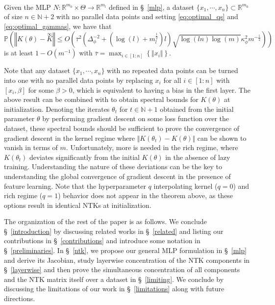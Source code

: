 \documentclass[twoside,11pt]{article}
\newcommand{\R}{\mathbb{R}}
\newcommand{\N}{\mathbb{N}}
\newcommand{\Prob}{\mathbb{P}}
\newcommand{\limiting}[1]{\overset{\scriptscriptstyle\infty}{#1}}
\begin{document}
\begin{theorem}~\\
Given the MLP $N: \R^{m_0} \times \Theta \to \R^{m_l}$ defined in \S~\ref{mlp}, a dataset $\{x_1,\cdots,x_n\} \subset \R^{m_0}$ of size $n \in \N+2$ with no parallel data points and setting \eqref{eq:optimal_qs} and \eqref{eq:optimal_gammas}, we have that
\[
\Prob\left( \left\Vert K(\theta) - \limiting{K} \right\Vert \leq O\left( \overline{\tau}^2 \left( \Delta_\phi^{-2} + \left( \log(l) + m_l^{\frac{1}{2}} \right) l \right) \sqrt{\log(ln) \log(m)} \kappa_\phi^2 m^{-\frac{1}{2}} \right) \right)
\]
is at least $1-O(m^{-1})$ with $\overline{\tau} = \max_{i \in [1:n]}\left\{ \Vert x_i \Vert \right\}$.
\end{theorem}

Note that any dataset $\{x_1,\cdots,x_n\}$ with no repeated data points can be turned into one with no parallel data points by replacing $x_i$ for all $i \in [1:n]$ with $[x_i,\beta]$ for some $\beta>0$, which is equivalent to having a bias in the first layer. The above result can be combined with \citet[Theorem~18]{mlpsateoc1} to obtain spectral bounds for $K(\theta)$ at initialization. Denoting the iterates $\theta_t$ for $t \in \N+1$ obtained from the initial parameter $\theta$ by performing gradient descent on some loss function over the dataset, these spectral bounds should be sufficient to prove the convergence of gradient descent in the kernel regime where $\Vert K(\theta_t) - K(\theta) \Vert$ can be shown to vanish in terms of $m$. Unfortunately, more is needed in the rich regime, where $K(\theta_t)$ deviates significantly from the initial $K(\theta)$ in the absence of lazy training. Understanding the nature of these deviations can be the key to understanding the global convergence of gradient descent in the presence of feature learning. Note that the hyperparameter $q$ interpolating kernel ($q=0$) and rich regime ($q=1$) behavior does not appear in the theorem above, as these options result in identical NTKs at initialization. 

The organization of the rest of the paper is as follows. We conclude \S~\ref{introduction} by discussing related works in \S~\ref{related} and listing our contributions in \S~\ref{contributions} and introduce some notation in \S~\ref{preliminaries}. In \S~\ref{ntk}, we propose our general MLP formulation in \S~\ref{mlp} and derive its Jacobian, study layerwise concentration of the NTK components in \S~\ref{layerwise} and then prove the simultaneous concentration of all components and the NTK matrix itself over a dataset in \S~\ref{limiting}. We conclude by discussing the limitations of our work in \S~\ref{limitations} along with future directions.
\end{document}
